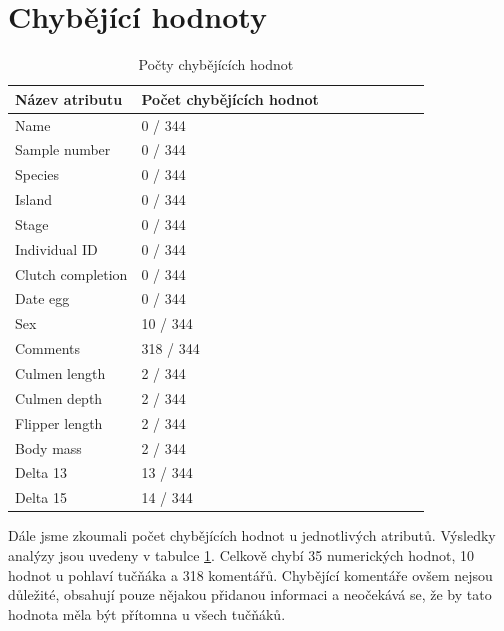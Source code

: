 \documentclass[10pt,xcolor=pdflatex,dvipsnames,table,oneside]{book}
\begin{document}
\section*{Chybějící hodnoty}
\begin{table}[]
  \centering
  \begin{tabular}{|l|l|l|l|l|l|l|l|l|}
    \hline
    \textbf{Název atributu} & \textbf{Počet chybějících hodnot} \\ \hline
    Name                    & 0 / 344                           \\ \hline
    Sample number           & 0 / 344                           \\ \hline
    Species                 & 0 / 344                           \\ \hline
    Island                  & 0 / 344                           \\ \hline
    Stage                   & 0 / 344                           \\ \hline
    Individual ID           & 0 / 344                           \\ \hline
    Clutch completion       & 0 / 344                           \\ \hline
    Date egg                & 0 / 344                           \\ \hline
    Sex                     & 10 / 344                          \\ \hline
    Comments                & 318 / 344                         \\ \hline
    Culmen length           & 2 / 344                           \\ \hline
    Culmen depth            & 2 / 344                           \\ \hline
    Flipper length          & 2 / 344                           \\ \hline
    Body mass               & 2 / 344                           \\ \hline
    Delta 13                & 13 / 344                          \\ \hline
    Delta 15                & 14 / 344                          \\ \hline
  \end{tabular}
  \caption{Počty chybějících hodnot}
  \label{tab:missing}
\end{table}

Dále jsme zkoumali počet chybějících hodnot u jednotlivých atributů. Výsledky analýzy jsou uvedeny v tabulce \ref{tab:missing}.
Celkově chybí 35 numerických hodnot, 10 hodnot u pohlaví tučňáka a 318 komentářů. Chybějící komentáře ovšem nejsou důležité, obsahují pouze nějakou přidanou informaci a neočekává se, že by tato hodnota měla být přítomna u všech tučňáků.
\end{document}

